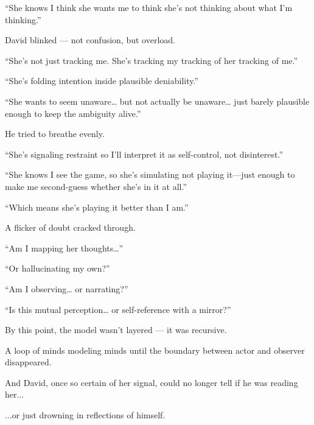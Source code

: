 “She knows I think she wants me to think she’s not thinking about what I’m thinking.”

David blinked — not confusion, but overload.

“She’s not just tracking me. She’s tracking my tracking of her tracking of me.”

“She’s folding intention inside plausible deniability.”

“She wants to seem unaware… but not actually be unaware… just barely plausible enough to keep the ambiguity alive.”

He tried to breathe evenly.

“She’s signaling restraint so I’ll interpret it as self-control, not disinterest.”

“She knows I see the game, so she’s simulating not playing it—just enough to make me second-guess whether she’s in it at all.”

“Which means she’s playing it better than I am.”

A flicker of doubt cracked through.

“Am I mapping her thoughts…”

“Or hallucinating my own?”

“Am I observing… or narrating?”

“Is this mutual perception… or self-reference with a mirror?”

By this point, the model wasn’t layered — it was recursive.

A loop of minds modeling minds until the boundary between actor and observer disappeared.

And David, once so certain of her signal, could no longer tell if he was reading her...

...or just drowning in reflections of himself.

\medskip

